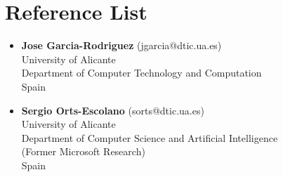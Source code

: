 \documentclass[8pt]{article}
\begin{document}
\section*{Reference List}
\begin{itemize}
	\item {\textbf{Jose Garcia-Rodriguez} (jgarcia@dtic.ua.es)\\
    University of Alicante\\
    Department of Computer Technology and Computation\\
    Spain\\}
	\item {\textbf{Sergio Orts-Escolano} (sorts@dtic.ua.es)\\
University of Alicante\\
		Department of Computer Science and Artificial Intelligence\\
		(Former Microsoft Research)\\
		Spain\\}

\end{itemize}
 
\end{document}
